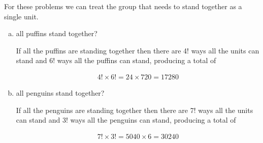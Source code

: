\documentclass{article}
\begin{document}
For these problems we can treat the group that needs to stand together as a single unit.

\begin{enumerate}[a)]
    \item all puffins stand together?

    If all the puffins are standing together then there are 4! ways all the units can stand and 6! ways all the puffins can stand, producing a total of

    \begin{align*}
        4! \times 6! = 24 \times 720 = 17280
    \end{align*}

    \item all penguins stand together?

    If all the penguins are standing together then there are 7! ways all the units can stand and 3! ways all the penguins can stand, producing a total of

    \begin{align*}
        7! \times 3! = 5040 \times 6 = 30240
    \end{align*}
\end{enumerate}
\end{document}
